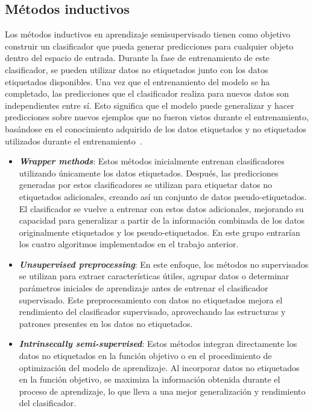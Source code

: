 \subsection{Métodos inductivos}
Los métodos inductivos en aprendizaje semisupervisado tienen como objetivo construir un clasificador que pueda generar predicciones para cualquier objeto dentro del espacio de entrada. Durante la fase de entrenamiento de este clasificador, se pueden utilizar datos no etiquetados junto con los datos etiquetados disponibles. Una vez que el entrenamiento del modelo se ha completado, las predicciones que el clasificador realiza para nuevos datos son independientes entre sí. Esto significa que el modelo puede generalizar y hacer predicciones sobre nuevos ejemplos que no fueron vistos durante el entrenamiento, basándose en el conocimiento adquirido de los datos etiquetados y no etiquetados utilizados durante el entrenamiento~\cite{Engelen:semi-supervised}.
\begin{itemize}
	\item \textbf{\textit{Wrapper methods}}: Estos métodos inicialmente entrenan clasificadores utilizando únicamente los datos etiquetados. Después, las predicciones generadas por estos clasificadores se utilizan para etiquetar datos no etiquetados adicionales, creando así un conjunto de datos pseudo-etiquetados. El clasificador se vuelve a entrenar con estos datos adicionales, mejorando su capacidad para generalizar a partir de la información combinada de los datos originalmente etiquetados y los pseudo-etiquetados. En este grupo entrarían los cuatro algoritmos implementados en el trabajo anterior.
	\item \textbf{\textit{Unsupervised preprocessing}}: En este enfoque, los métodos no supervisados se utilizan para extraer características útiles, agrupar datos o determinar parámetros iniciales de aprendizaje antes de entrenar el clasificador supervisado. Este preprocesamiento con datos no etiquetados mejora el rendimiento del clasificador supervisado, aprovechando las estructuras y patrones presentes en los datos no etiquetados.
	\item \textbf{\textit{Intrinsecally semi-supervised}}: Estos métodos integran directamente los datos no etiquetados en la función objetivo o en el procedimiento de optimización del modelo de aprendizaje. Al incorporar datos no etiquetados en la función objetivo, se maximiza la información obtenida durante el proceso de aprendizaje, lo que lleva a una mejor generalización y rendimiento del clasificador.
	
\end{itemize}
